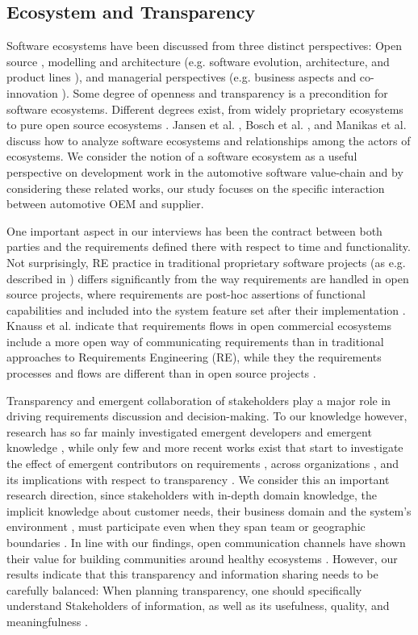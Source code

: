 \subsection{Ecosystem and Transparency}
Software ecosystems have been discussed from three distinct perspectives: Open source
\cite{Scacchi2009}, modelling and architecture (e.g. software evolution, architecture, and product lines \cite{Bosch2009}), and managerial perspectives (e.g. business aspects and co-innovation \cite{Jansen2012b}). 
Some degree of openness and transparency is a precondition for software ecosystems. Different degrees exist, from widely proprietary ecosystems to pure open source ecosystems \cite{Angeren2012,Jansen2012c}.
Jansen et al. \cite{Jansen2012a}, Bosch et al. \cite{Bosch2009}, and Manikas et al. \cite{Manikas2013b} discuss how to analyze software ecosystems and relationships among the actors of ecosystems. 
We consider the notion of a software ecosystem as a useful perspective on development work in the automotive software value-chain \cite{Knauss2014d} and by considering these related works, our study focuses on the specific interaction between automotive OEM and supplier.

One important aspect in our interviews has been the contract between both parties and the requirements defined there with respect to time and functionality. 
Not surprisingly, RE practice in traditional proprietary software projects (as e.g. described in \cite{Robertson1999,Ruhe2010}) differs significantly from the way requirements are handled in open source projects, where requirements are post-hoc assertions of functional capabilities and included into the system feature set after their implementation \cite{Scacchi2009}.
Knauss et al. indicate that requirements flows in open commercial ecosystems include a more open way of communicating requirements than in traditional approaches to Requirements Engineering (RE), while they the requirements processes and flows are different than in open source projects \cite{KYB+2016}. 


Transparency and emergent collaboration of stakeholders play a major role in driving requirements discussion and decision-making.
To our knowledge however, research has so far mainly investigated emergent developers \cite{Minto2007,Haenni2014,Sadi2015} and emergent knowledge \cite{Treude2012}, while only few and more recent works exist that start to investigate the effect of emergent contributors on requirements \cite{Kwan2011}, across organizations \cite{Linaker2016,KYB+2016}, and its implications with respect to transparency \cite{Dabbish2013,Hosseini2016}. 
We consider this an important research direction, since stakeholders with in-depth domain knowledge, the implicit knowledge about customer needs, their business domain and the system’s environment \cite{Damian2013}, must participate even when they span team or geographic boundaries \cite{boden2009bridging}.
In line with our findings, open communication channels have shown their value for building communities around healthy ecosystems  \cite{Kilamo2012}.
However, our results indicate that this transparency and information sharing needs to be carefully balanced: When planning transparency, one should specifically understand Stakeholders of information, as well as its usefulness, quality, and meaningfulness \cite{Hosseini2016}.